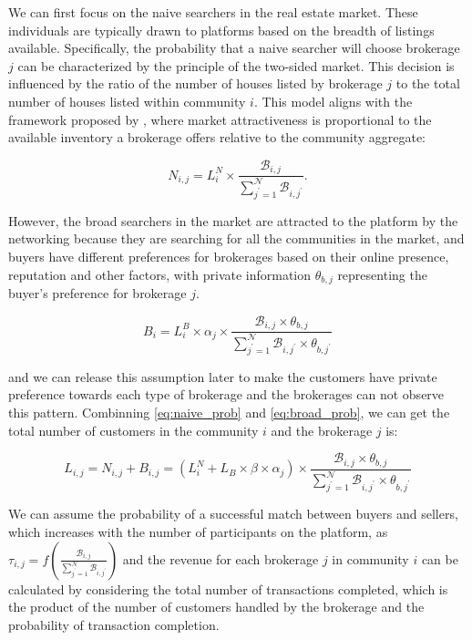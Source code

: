We can first focus on the naive searchers in the real estate market. These individuals are typically drawn to platforms based on the breadth of listings available. Specifically, the probability that a naive searcher will choose brokerage $j$ can be characterized by the principle of the two-sided market. This decision is influenced by the ratio of the number of houses listed by brokerage $j$ to the total number of houses listed within community $i$. This model aligns with the framework proposed by \citep{Armstrong2006}, where market attractiveness is proportional to the available inventory a brokerage offers relative to the community aggregate:

\begin{equation}
  N_{i, j} = L^N_i \times \frac{\mathcal{B}_{i, j}}{\sum_{j^\prime=1}^{\mathcal{N}}\mathcal{B}_{i, j^\prime}}. \label{eq:naive_prob}
\end{equation}

However, the broad searchers in the market are attracted to the platform by the networking because they are searching for all the communities in the market, and buyers have different preferences for brokerages based on their online presence, reputation and other factors, with private information $\theta_{b, j}$ representing the buyer's preference for brokerage $j$.

\begin{equation}
  B_i = L^B_i \times \alpha_j \times \frac{\mathcal{B}_{i, j} \times \theta_{b, j}}{\sum_{j^\prime=1}^{\mathcal{N}}\mathcal{B}_{i, j^\prime} \times \theta_{b, j^\prime}} \label{eq:broad_prob}
\end{equation}

and we can release this assumption later to make the customers have private preference towards each type of brokerage and the brokerages can not observe this pattern. Combinning \eqref{eq:naive_prob} and \eqref{eq:broad_prob}, we can get the total number of customers in the community $i$ and the brokerage $j$ is:

\begin{equation}
  L_{i, j} = N_{i, j} + B_{i, j} = (L^N_i + L_B \times \beta \times \alpha_j) \times \frac{\mathcal{B}_{i, j} \times \theta_{b, j}}{\sum_{j^\prime=1}^{\mathcal{N}}\mathcal{B}_{i, j^\prime} \times \theta_{b, j^\prime}}
   \label{eq:total_prob}
\end{equation}

We can assume the probability of a successful match between buyers and sellers, which increases with the number of participants on the platform, as $\tau_{i, j} = f(\frac{\mathcal{B}_{i, j}}{\sum_{j^\prime=1}^{\mathcal{N}}\mathcal{B}_{i, j^\prime}})$ and the revenue for each brokerage $j$ in community $i$ can be calculated by considering the total number of transactions completed, which is the product of the number of customers handled by the brokerage and the probability of transaction completion.

